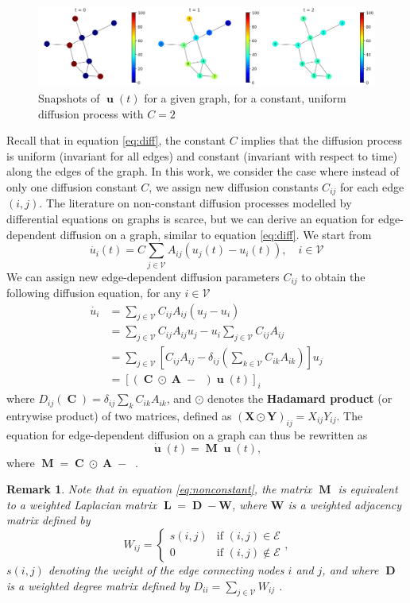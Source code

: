 \documentclass[12pt, oneside]{report}   	%
\newtheorem{rmk}{Remark}
\DeclareMathOperator{\Adj}{\boldsymbol{A}}
\DeclareMathOperator{\Lplc}{\boldsymbol{L}}
\DeclareMathOperator{\CC}{\boldsymbol{C}}
\DeclareMathOperator{\MM}{\boldsymbol{M}}
\DeclareMathOperator{\DC}{\boldsymbol{D}(\boldsymbol{C})}
\DeclareMathOperator{\DD}{\boldsymbol{D}}
\DeclareMathOperator{\uu}{\boldsymbol{u}}
\begin{document}
\begin{figure}[t]
    \centering
    \includegraphics[width=\textwidth]{diff_progression.png}
    \caption{Snapshots of $\uu(t)$ for a given graph, for a constant, uniform diffusion process with $C=2$}
    \label{fig:diff_snapshots}
\end{figure}
\noindent Recall that in equation \eqref{eq:diff}, the constant $C$ implies that the diffusion process is uniform (invariant for all edges) and constant (invariant with respect to time) along the edges of the graph. In this work, we consider the case where instead of only one diffusion constant $C$, we assign new diffusion constants $C_{ij}$ for each edge $(i,j)$. The literature on non-constant diffusion processes modelled by differential equations on graphs is scarce, but we can derive an equation for edge-dependent diffusion on a graph, similar to equation \eqref{eq:diff}. We start from
\[\dot{u_i}(t) = C \sum_{j\in\mathcal{V}} A_{ij}(u_j(t) - u_i(t)), \quad i\in\mathcal{V}\]
We can assign new edge-dependent diffusion parameters $C_{ij}$ to obtain the following diffusion equation, for any $i\in\mathcal{V}$
\begin{align*}
\dot{u_i} &= \sum_{j\in\mathcal{V}} C_{ij} A_{ij}(u_j - u_i) \\
&= \sum_{j\in\mathcal{V}} C_{ij} A_{ij}u_j - u_i \sum_{j\in\mathcal{V}} C_{ij} A_{ij} \\
&= \sum_{j\in\mathcal{V}} \left[C_{ij} A_{ij} - \delta_{ij}\left(\sum_{k\in\mathcal{V}} C_{ik} A_{ik}\right)\right] u_j \\
&= \left[(\CC \odot \Adj - \DC)\uu(t)\right]_i
\end{align*}
where $D_{ij}(\CC) = \delta_{ij}\sum_k C_{ik} A_{ik}$, and $\odot$ denotes the \textbf{Hadamard product} (or entrywise product) of two matrices, defined as $(\boldsymbol{X}\odot\boldsymbol{Y})_{ij}=X_{ij}Y_{ij}$. The equation for edge-dependent diffusion on a graph can thus be rewritten as
\begin{equation}
\label{eq:nonconstant}
\dot{\uu}(t)=\MM\uu(t),
\end{equation}
where $\MM=\CC\odot\Adj-\DC$.
\begin{rmk}
\label{rmk:weightedlap}
Note that in equation \eqref{eq:nonconstant}, the matrix $\MM$ is equivalent to a weighted Laplacian matrix $\Lplc=\DD-\boldsymbol{W}$, where $\boldsymbol{W}$ is a weighted adjacency matrix defined by 
$$
W_{ij} = 
    \begin{cases}
        s(i,j) & \text{if } (i,j)\in\mathcal{E}\\
        0 & \text{if } (i,j)\notin\mathcal{E}
    \end{cases},
$$
$s(i,j)$ denoting the weight of the edge connecting nodes $i$ and $j$, and where $\DD$ is a weighted degree matrix defined by $D_{ii}=\sum_{j\in\mathcal{V}}W_{ij}$ \cite{foucart2022mathematical}.
\end{rmk}
\end{document}
